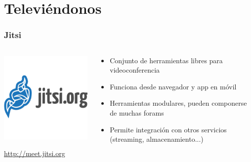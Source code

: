 %
%

\section{Televiéndonos}

\begin{frame}
\frametitle{Jitsi}

\begin{columns}[T]
\begin{column}{.48\textwidth}
\includegraphics[width=6.5cm]{figs/jitsi-logo}

\begin{flushright}
  {\Large
    \url{http://meet.jitsi.org}
  }
\end{flushright}

\end{column}%
\hfill%
\begin{column}{.50\textwidth}
{\Large
\begin{itemize}
\item Conjunto de herramientas libres para videoconferencia
\item Funciona desde navegador y app en móvil
\item Herramientas modulares, pueden componerse de muchas forams
\item Permite integración con otros servicios (streaming, almacenamiento...)
\end{itemize}
}
\end{column}%
\end{columns}

\end{frame}


